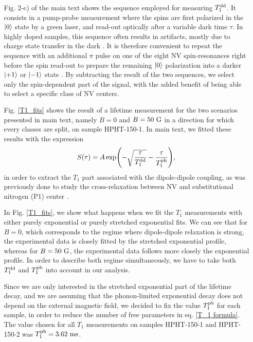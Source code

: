 \documentclass[preprintnumbers,amsmath,amssymb,onecolumn,12pt]{revtex4-2}\usepackage{graphicx}%
\begin{document}

Fig. 2-c) of the main text shows the sequence employed for measuring $T_1^{\rm dd}$. 
It consists in a pump-probe measurement where the spins are first polarized in the $\ket{0}$ state by a green laser, and read-out optically after a variable dark time $\tau$. In highly doped samples, this sequence often results in artifacts, mostly due to charge state transfer in the dark \citep{giri_coupled_2018, giri_selective_2019, choi_depolarization_2017}. It is therefore convenient to repeat the sequence with an additional $\pi$ pulse on one of the eight NV spin-resonances right before the spin read-out to prepare the remaining $\ket{0}$ polarization into a darker $\ket{+1}$ or $\ket{-1}$ state \citep{jarmola_temperature-_2012,mrozek_longitudinal_2015,choi_depolarization_2017}. By subtracting the result of the two sequences, we select only the spin-dependent part of the signal, with the added benefit of being able to select a specific class of NV centers.

Fig. \ref{T1_fits} shows the result of a lifetime measurement for the two scenarios presented in main text, namely $B=0$ and $B=50\ \rm G$ in a direction for which every classes are split, on sample HPHT-150-1. In main text, we fitted these results with the expression 
\begin{equation}
S(\tau)=A \exp(-\sqrt{\frac{\tau}{T_1^{\rm dd}}}-\frac{\tau}{T_1^{\rm ph}}),
\label{T_1 formula}
\end{equation}
in order to extract the $T_1$ part associated with the dipole-dipole coupling, as was previously done to study the cross-relaxation between NV and substitutional nitrogen (P1) center \citep{Hall}.

In Fig. \ref{T1_fits}, we show what happens when we fit the $T_1$ measurements with either purely exponential or purely stretched exponential fits. We can see that for $B=0$, which corresponds to the regime where dipole-dipole relaxation is strong, the experimental data is closely fitted by the stretched exponential profile, whereas for $B=50\ \rm G$, the experimental data follows more closely the exponential profile. In order to describe both regime simultaneously, we have to take both $T_1^{\rm dd}$ and $T_1^{\rm ph}$ into account in our analysis.

Since we are only interested in the stretched exponential part of the lifetime decay, and we are assuming that the phonon-limited exponential decay does not depend on the external magnetic field, we decided to fix the value $T_1^{\rm ph}$ for each sample, in order to reduce the number of free parameters in eq. \ref{T_1 formula}. The value chosen for all $T_1$ measurements on samples HPHT-150-1 and HPHT-150-2 was $T_1^{\rm ph}=3.62\ \rm ms$.
\end{document}
